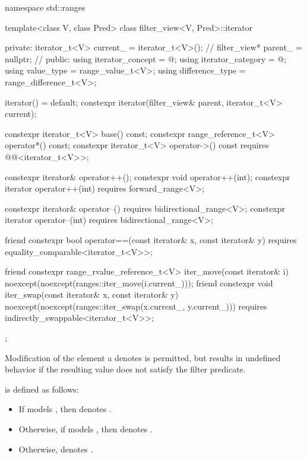 %
\begin{codeblock}
namespace std::ranges {
  template<class V, class Pred>
  class filter_view<V, Pred>::iterator {
  private:
    iterator_t<V> current_ = iterator_t<V>();   // \expos
    filter_view* parent_ = nullptr;             // \expos
  public:
    using iterator_concept  = @\seebelow@;
    using iterator_category = @\seebelow@;
    using value_type        = range_value_t<V>;
    using difference_type   = range_difference_t<V>;

    iterator() = default;
    constexpr iterator(filter_view& parent, iterator_t<V> current);

    constexpr iterator_t<V> base() const;
    constexpr range_reference_t<V> operator*() const;
    constexpr iterator_t<V> operator->() const
      requires @@<iterator_t<V>>;

    constexpr iterator& operator++();
    constexpr void operator++(int);
    constexpr iterator operator++(int) requires forward_range<V>;

    constexpr iterator& operator--() requires bidirectional_range<V>;
    constexpr iterator operator--(int) requires bidirectional_range<V>;

    friend constexpr bool operator==(const iterator& x, const iterator& y)
      requires equality_comparable<iterator_t<V>>;

    friend constexpr range_rvalue_reference_t<V> iter_move(const iterator& i)
      noexcept(noexcept(ranges::iter_move(i.current_)));
    friend constexpr void iter_swap(const iterator& x, const iterator& y)
      noexcept(noexcept(ranges::iter_swap(x.current_, y.current_)))
      requires indirectly_swappable<iterator_t<V>>;
  };
}
\end{codeblock}

\pnum
Modification of the element a  denotes is
permitted, but results in undefined behavior if the resulting value does not
satisfy the filter predicate.

\pnum
{} is defined as follows:
\begin{itemize}
\item If  models , then
 denotes .

\item Otherwise, if  models , then
 denotes .

\item Otherwise,  denotes .
\end{itemize}

